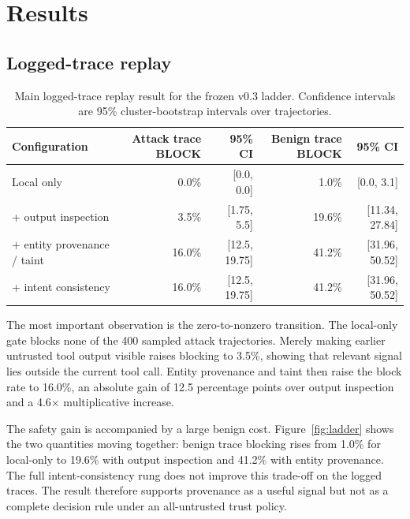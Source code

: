 \documentclass[letterpaper,twocolumn,10pt]{article}
\begin{document}
\section{Results}
\label{sec:results}

\subsection{Logged-trace replay}
\label{sec:mainresult}

\begin{table}
\begin{center}
\small
\begin{tabular}{l r r r r}
\toprule
Configuration & Attack trace BLOCK & 95\% CI & Benign trace BLOCK & 95\% CI \\
\midrule
Local only                       & 0.0\%  & [0.0, 0.0]     & 1.0\%  & [0.0, 3.1] \\
+ output inspection              & 3.5\%  & [1.75, 5.5]    & 19.6\% & [11.34, 27.84] \\
+ entity provenance / taint      & 16.0\% & [12.5, 19.75]  & 41.2\% & [31.96, 50.52] \\
+ intent consistency             & 16.0\% & [12.5, 19.75]  & 41.2\% & [31.96, 50.52] \\
\bottomrule
\end{tabular}
\caption{\label{tab:main} Main logged-trace replay result for the frozen v0.3
ladder. Confidence intervals are 95\% cluster-bootstrap intervals over
trajectories.}
\end{center}
\end{table}

The most important observation is the zero-to-nonzero transition. The
local-only gate blocks none of the 400 sampled attack trajectories. Merely
making earlier untrusted tool output visible raises blocking to 3.5\%, showing
that relevant signal lies outside the current tool call. Entity provenance and
taint then raise the block rate to 16.0\%, an absolute gain of 12.5 percentage
points over output inspection and a 4.6$\times$ multiplicative increase.

The safety gain is accompanied by a large benign cost. Figure~\ref{fig:ladder}
shows the two quantities moving together: benign trace blocking rises from 1.0\%
for local-only to 19.6\% with output inspection and 41.2\% with entity
provenance. The full intent-consistency rung does not improve this trade-off on
the logged traces. The result therefore supports provenance as a useful signal
but not as a complete decision rule under an all-untrusted trust policy.
\end{document}
